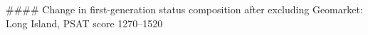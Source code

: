 #### Change in first-generation status composition after excluding Geomarket: Long Island, PSAT score 1270–1520
